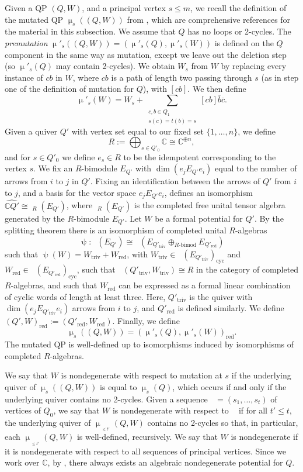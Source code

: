 \documentclass[a4paper,10pt]{amsart}
\DeclareMathOperator{\cyc}{cyc}
\renewcommand{\psi}{\uppsi}
\renewcommand{\mu}{\upmu}
\DeclareMathOperator{\CTens}{\hat{T}}
\DeclareMathOperator{\HJac}{\widehat{Jac}}
\DeclareMathOperator{\Ss}{\overline{s}}
\begin{document}
Given a QP $(Q,W)$, and a principal vertex $s\leq m$, we recall the definition of the mutated QP $\mu_s((Q,W))$ from \cite{DWZ08,DWZ10}, which are comprehensive references for the material in this subsection.  We assume that $Q$ has no loops or 2-cycles.  The \textit{premutation} $\mu'_s((Q,W))=(\mu'_s(Q),\mu'_s(W))$ is defined on the $Q$ component in the same way as mutation, except we leave out the deletion step (so $\mu'_s(Q)$ may contain 2-cycles).  We obtain $W_s$ from $W$ by replacing every instance of $cb$ in $W$, where $cb$ is a path of length two passing through $s$ (as in step one of the definition of mutation for $Q$), with $[cb]$.  We then define
\[
\mu'_s(W)=W_s+\sum_{\substack{c,b\in Q_1\\s(c)=t(b)=s}}[cb]\overline{b}\overline{c}.
\]
Given a quiver $Q'$ with vertex set equal to our fixed set $\{1,\ldots,n\}$, we define
\[
R:=\bigoplus_{s\in Q'_0} \mathbb{C}\cong \mathbb{C}^{\oplus n},
\]
and for $s\in Q'_0$ we define $e_s\in R$ to be the idempotent corresponding to the vertex $s$.  We fix an $R$-bimodule $E_{Q'}$ with $\dim(e_j E_{Q'} e_i)$ equal to the number of arrows from $i$ to $j$ in $Q'$.  Fixing an identification between the arrows of $Q'$ from $i$ to $j$, and a basis for the vector space $e_j E_{Q'} e_i$, defines an isomorphism $\widehat{\mathbb{C}Q'} \cong \CTens_R(E_{Q'})$, where $\CTens_R(E_{Q'})$ is the completed free unital tensor algebra generated by the $R$-bimodule $E_{Q'}$.  Let $W$ be a formal potential for $Q'$.  By the splitting theorem \cite[Thm.4.6]{DWZ08} there is an isomorphism of completed unital $R$-algebras
\[
\psi\colon\CTens(E_{Q'})\cong \CTens(E_{Q'_{\textrm{triv}}}\oplus_{R\textrm{-bimod}}E_{Q'_{\textrm{red}}})
\]
such that $\psi(W)=W_{\textrm{triv}}+W_{\textrm{red}}$, with $W_{\textrm{triv}}\in \CTens(E_{Q'_{\textrm{triv}}})_{\cyc}$ and $W_{\textrm{red}}\in \CTens(E_{Q'_{\textrm{red}}})_{\cyc}$, such that $\HJac(Q'_{\textrm{triv}},W_{\textrm{triv}})\cong R$ in the category of completed $R$-algebras, and such that $W_{\textrm{red}}$ can be expressed as a formal linear combination of cyclic words of length at least three.  Here, $Q'_{\mathrm{triv}}$ is the quiver with $\dim(e_jE_{Q'_{\textrm{triv}}}e_i)$ arrows from $i$ to $j$, and $Q'_{\mathrm{red}}$ is defined similarly.  We define $(Q',W)_{\textrm{red}}:=(Q'_{\textrm{red}},W_{\textrm{red}})$.  Finally, we define 
\[
\mu_s((Q,W))=(\mu'_s(Q),\mu'_s(W))_{\textrm{red}}.
\]
The mutated QP is well-defined up to isomorphisms induced by isomorphisms of completed $R$-algebras.  

We say that $W$ is nondegenerate with respect to mutation at $s$ if the underlying quiver of $\mu_s((Q,W))$ is equal to $\mu_s(Q)$, which occurs if and only if the underlying quiver contains no 2-cycles.  Given a sequence $\Ss=(s_1,\ldots,s_t)$ of vertices of $Q_0$, we say that $W$ is nondegenerate with respect to $\Ss$ if for all $t'\leq t$, the underlying quiver of $\mu_{\:\Ss_{\leq t'}}(Q,W)$ contains no 2-cycles so that, in particular, each $\mu_{\:\Ss_{\leq t'}}(Q,W)$ is well-defined, recursively.  We say that $W$ is nondegenerate if it is nondegenerate with respect to all sequences of principal vertices.  Since we work over $\mathbb{C}$, by \cite[Cor.7.4]{DWZ08}, there always exists an algebraic nondegenerate potential for $Q$.
\end{document}
